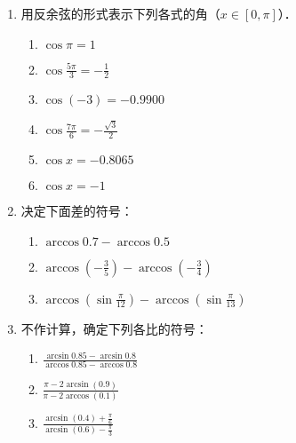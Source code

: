 \begin{enumerate}
    \item 用反余弦的形式表示下列各式的角（$x\in[0,\pi]$）．
\begin{multicols}{2}
\begin{enumerate}
    \item $\cos\pi =1$
    \item $\cos\frac{5\pi}{3}=-\frac{1}{2}$
    \item $\cos(-3)=-0.9900$
    \item $\cos\frac{7\pi}{6}=-\frac{\sqrt{3}}{2}$
    \item $\cos x=-0.8065$
    \item $\cos x=-1$
\end{enumerate}
\end{multicols}

\item 决定下面差的符号：
\begin{multicols}{2}
\begin{enumerate}
 \item $\arccos0.7-\arccos0.5$
\item $\arccos\left(-\frac{3}{5}\right)-\arccos\left(-\frac{3}{4}\right)$
\item $\arccos\left(\sin\frac{\pi}{12}\right)-\arccos\left(\sin\frac{\pi}{13}\right)$
\end{enumerate}
\end{multicols}
\item 不作计算，确定下列各比的符号：
\begin{multicols}{2}
\begin{enumerate}
    \item $\frac{\arcsin0.85-\arcsin0.8}{\arccos0.85-\arccos0.8}$
    \item $\frac{\pi -2\arcsin(0.9)}{\pi -2\arccos(0.1)}$
    \item $\frac{\arcsin(0.4)+\frac{\pi}{6}}{\arcsin(0.6)-\frac{\pi}{3}}$
\end{enumerate}
\end{multicols}


\end{enumerate}
